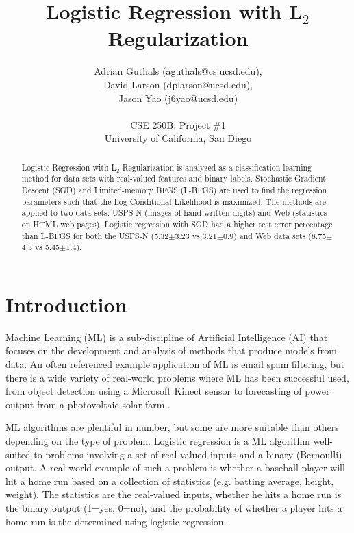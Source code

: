 \documentclass[10pt]{article}
\title{Logistic Regression with L$_2$ Regularization}
\author{Adrian Guthals (aguthals@cs.ucsd.edu),\\
David Larson (dplarson@ucsd.edu),\\
Jason Yao (j6yao@ucsd.edu)\\
\\
CSE 250B: Project \#1 \\
University of California, San Diego \\
}
\begin{document}
\maketitle


\begin{abstract}
Logistic Regression with L$_2$ Regularization is analyzed as a classification learning method for data sets with real-valued features and binary labels. Stochastic Gradient Descent (SGD) and Limited-memory BFGS (L-BFGS) are used to find the regression parameters such that the Log Conditional Likelihood is maximized. The methods are applied to two data sets: USPS-N (images of hand-written digits) and Web (statistics on HTML web pages). Logistic regression with SGD had a higher test error percentage than L-BFGS for both the USPS-N (5.32$\pm$3.23 vs 3.21$\pm$0.9) and Web data sets (8.75$\pm$4.3 vs 5.45$\pm$1.4).
\end{abstract}



\section{Introduction}
\label{sec:intro}

Machine Learning (ML) is a sub-discipline of Artificial Intelligence (AI) that focuses on the development and analysis of methods that produce models from data. An often referenced example application of ML is email spam filtering, but there is a wide variety of real-world problems where ML has been successful used, from object detection using a Microsoft Kinect sensor \cite{Kinect} to forecasting of power output from a photovoltaic solar farm \cite{solar}.

ML algorithms are plentiful in number, but some are more suitable than others depending on the type of problem. Logistic regression is a ML algorithm well-suited to problems involving a set of real-valued inputs and a binary (Bernoulli) output. A real-world example of such a problem is whether a baseball player will hit a home run based on a collection of statistics (e.g. batting average, height, weight). The statistics are the real-valued inputs, whether he hits a home run is the binary output (1=yes, 0=no), and the probability of whether a player hits a home run is the determined using logistic regression. 
\end{document}
